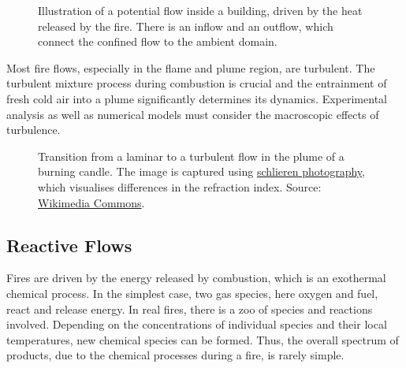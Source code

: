 \documentclass[
  letterpaper,
  DIV=11,
  numbers=noendperiod]{scrreprt}
\begin{document}
\begin{figure}


\caption{\label{fig-compartment-flow}Illustration of a potential flow
inside a building, driven by the heat released by the fire. There is an
inflow and an outflow, which connect the confined flow to the ambient
domain.}

\end{figure}%

Most fire flows, especially in the flame and plume region, are
turbulent. The turbulent mixture process during combustion is crucial
and the entrainment of fresh cold air into a plume significantly
determines its dynamics. Experimental analysis as well as numerical
models must consider the macroscopic effects of turbulence.

\begin{figure}


\caption{\label{fig-turbulence-transition-candle}Transition from a
laminar to a turbulent flow in the plume of a burning candle. The image
is captured using
\href{https://en.wikipedia.org/wiki/Schlieren_photography}{schlieren
photography}, which visualises differences in the refraction index.
Source:
\href{https://commons.wikimedia.org/wiki/File:Laminar-turbulent_transition.jpg}{Wikimedia
Commons}.}

\end{figure}%

\subsection{Reactive Flows}\label{reactive-flows}

Fires are driven by the energy released by combustion, which is an
exothermal chemical process. In the simplest case, two gas species, here
oxygen and fuel, react and release energy. In real fires, there is a zoo
of species and reactions involved. Depending on the concentrations of
individual species and their local temperatures, new chemical species
can be formed. Thus, the overall spectrum of products, due to the
chemical processes during a fire, is rarely simple.
\end{document}

